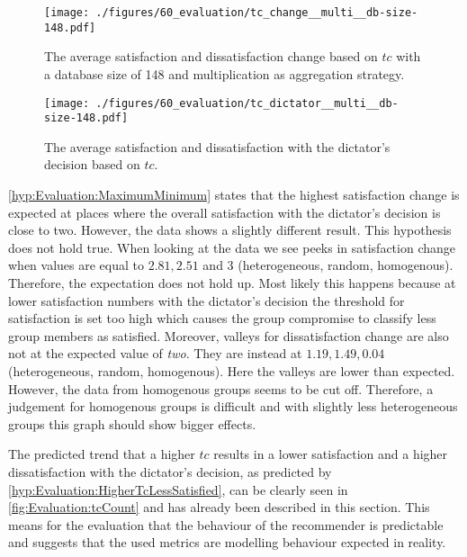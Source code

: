 \begin{figure}
    \centering
    \texttt{[image: ./figures/60\_evaluation/tc\_change\_\_multi\_\_db-size-148.pdf]}
    \caption[Satisfaction and Dissatisfaction: Change based on $tc$]{The average satisfaction and dissatisfaction change based on $tc$ with a database size of 148 and multiplication as aggregation strategy.}
    \label{fig:Evaluation:tcChange}
\end{figure}

\begin{figure}
    \centering
    \texttt{[image: ./figures/60\_evaluation/tc\_dictator\_\_multi\_\_db-size-148.pdf]}
    \caption[Satisfaction and Dissatisfaction: Average based on $tc$]{The average satisfaction and dissatisfaction with the dictator's decision based on $tc$.}
    \label{fig:Evaluation:tcCount}
\end{figure}


\autoref{hyp:Evaluation:MaximumMinimum} states that the highest satisfaction change is expected at places where the overall satisfaction with the dictator's decision is close to two. However, the data shows a slightly different result. This hypothesis does not hold true. When looking at the data we see peeks in satisfaction change when values are equal to $2.81, 2.51$ and $3$ (heterogeneous, random, homogenous). Therefore, the expectation does not hold up. Most likely this happens because at lower satisfaction numbers with the dictator's decision the threshold for satisfaction is set too high which causes the group compromise to classify less group members as satisfied. Moreover, valleys for dissatisfaction change are also not at the expected value of \textit{two}. They are instead at $1.19, 1.49, 0.04$ (heterogeneous, random, homogenous). Here the valleys are lower than expected. However, the data from homogenous groups seems to be cut off. Therefore, a judgement for homogenous groups is difficult and with slightly less heterogeneous groups this graph should show bigger effects.



The predicted trend that a higher $tc$ results in a lower satisfaction and a higher dissatisfaction with the dictator's decision, as predicted by \autoref{hyp:Evaluation:HigherTcLessSatisfied}, can be clearly seen in \autoref{fig:Evaluation:tcCount} and has already been described in this section. This means for the evaluation that the behaviour of the recommender is predictable and suggests that the used metrics are modelling behaviour expected in reality.

